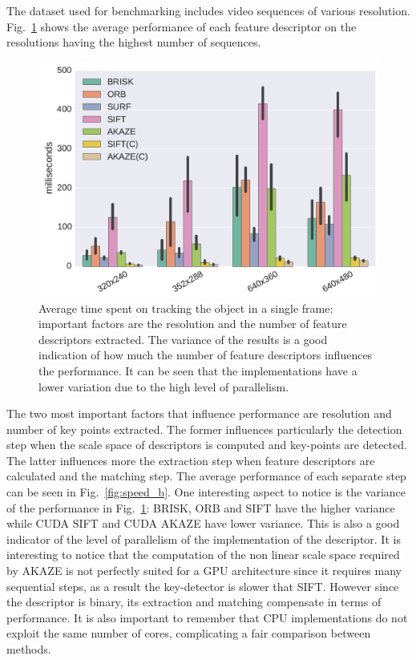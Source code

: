 The dataset used for benchmarking includes video sequences of various resolution. Fig.~\ref{fig:speed} shows the average performance of each feature descriptor on the resolutions having the highest number of sequences. 

\begin{figure}[!htb]
	\includegraphics[width=0.95\linewidth]{imgs/tracker_fps_std.pdf}
\vspace{-2.5mm}	
\caption{Average time spent on tracking the object in a single frame: important factors are the resolution and the number of feature descriptors extracted. The variance of the results is a good indication of how much the number of feature descriptors influences the performance. It can be seen that the implementations have a lower variation due to the high level of parallelism. }
\label{fig:speed}
\end{figure}

The two most important factors that influence performance are resolution and number of key points extracted. The former influences particularly the detection step when the scale space of descriptors is computed and key-points are detected. The latter influences more the extraction step when feature descriptors are calculated and the matching step. The average performance of each separate step can be seen in Fig.~\ref{fig:speed_b}. One interesting aspect to notice is the variance of the performance in Fig.~\ref{fig:speed}: BRISK, ORB and SIFT have the higher variance while CUDA SIFT and CUDA AKAZE have lower variance. This is also a good indicator of the level of parallelism of the implementation of the descriptor. It is interesting to notice that the computation of the non linear scale space required by AKAZE is not perfectly suited for a GPU architecture since it requires many sequential steps, as a result the key-detector is slower that SIFT. However since the descriptor is binary, its extraction and matching compensate in terms of performance. It is also important to remember that CPU implementations do not exploit the same number of cores, complicating a fair comparison between methods.

